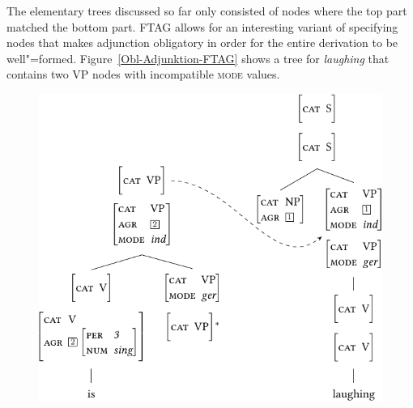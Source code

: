 The elementary trees discussed so far only consisted of nodes where the top part matched the bottom part. FTAG allows for an interesting variant of specifying 
nodes that makes adjunction obligatory in order for the entire derivation to be well"=formed.
Figure~\vref{Obl-Adjunktion-FTAG} shows a tree for \emph{laughing} that contains two VP nodes with incompatible \textsc{mode} values.
\begin{figure}
\centerline{%
\includegraphics{Figures/tag-obl-adj-ftag-cropped}
}

\end{figure}
